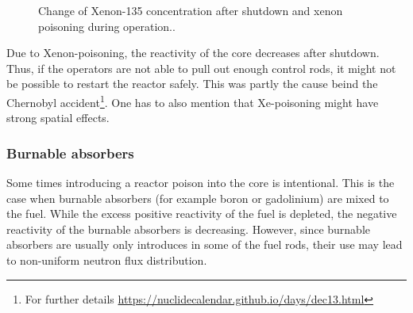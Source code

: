 \begin{figure}[ht!]
\protect {}\protect
\caption{\label{fig:xenonpois} \footnotesize{Change of Xenon-135 concentration after shutdown and xenon poisoning during operation..}}
\end{figure}

Due to Xenon-poisoning, the reactivity of the core decreases after shutdown. Thus, if the operators are not able to pull out enough control rods, it might not be possible to restart the reactor safely. This was partly the cause beind the Chernobyl accident\footnote{For further details \url{https://nuclidecalendar.github.io/days/dec13.html}}. One has to also mention that Xe-poisoning might have strong spatial effects. 

\subsubsection{Burnable absorbers}

Some times introducing a reactor poison into the core is intentional. This is the case when burnable absorbers (for example boron or gadolinium) are mixed to the fuel. While the excess positive reactivity of the fuel is depleted, the negative reactivity of the burnable absorbers is decreasing. However, since burnable absorbers are usually only introduces in some of the fuel rods, their use may lead to non-uniform neutron flux distribution.

%
